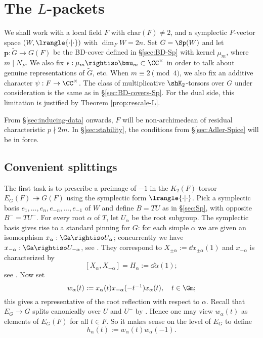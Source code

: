 \documentclass[a4paper,10pt]{article}
\begin{document}
\section{The \texorpdfstring{$L$}{L}-packets}\label{sec:packets}
We shall work with a local field $F$ with $\text{char}(F) \neq 2$, and a symplectic $F$-vector space $(W, \lrangle{\cdot|\cdot})$ with $\dim_F W = 2n$. Set $G = \Sp(W)$ and let $\bm{p}: \tilde{G} \to G(F)$ be the BD-cover defined in \S\ref{sec:BD-Sp} with kernel $\mu_m$, where $m \mid N_F$. We also fix $\epsilon: \mu_m \rightiso \bmu_m \subset \CC^\times$ in order to talk about genuine representations of $\tilde{G}$, etc. When $m \equiv 2 \pmod 4$, we also fix an additive character $\psi: F \to \CC^\times$. The class of multiplicative $\shK_2$-torsors over $G$ under consideration is the same as in \S\ref{sec:BD-covers-Sp}. For the dual side, this limitation is justified by Theorem \ref{prop:rescale-L}.

From \S\ref{sec:inducing-data} onwards, $F$ will be non-archimedean of residual characteristic $p \nmid 2m$. In \S\ref{sec:stability}, the conditions from \S\ref{sec:Adler-Spice} will be in force.

\subsection{Convenient splittings}\label{sec:splittings-S}
The first task is to prescribe a preimage of $-1$ in the $K_2(F)$-torsor $E_G(F) \twoheadrightarrow G(F)$ using the symplectic form $\lrangle{\cdot|\cdot}$. Pick a symplectic basis $e_1, \ldots, e_n, e_{-n}, \ldots, e_{-1}$ of $W$ and define $B = TU$ as in \S\ref{sec:Sp}, with opposite $B^- = TU^-$. For every root $\alpha$ of $T$, let $U_\alpha$ be the root subgroup. The symplectic basis gives rise to a standard pinning for $G$: for each simple $\alpha$ we are given an isomorphism $x_\alpha: \Ga \rightiso U_\alpha$; concurrently we have $x_{-\alpha}: \Ga \rightiso U_{-\alpha}$, see \cite[Exp XXIII, 1.2]{SGA3-3}. They correspond to $X_{\pm\alpha} := \dd x_{\pm\alpha}(1)$ and $x_{-\alpha}$ is characterized by
\[ [X_\alpha, X_{-\alpha}] = H_\alpha := \dd\check{\alpha}(1); \]
see \cite[Exp XX, Corollaire 2.11]{SGA3-3}. Now set
\[ w_\alpha(t) := x_\alpha(t) x_{-\alpha}(-t^{-1}) x_\alpha(t), \quad t \in \Gm; \]
this gives a representative of the root reflection with respect to $\alpha$. Recall that $E_G \to G$ splits canonically over $U$ and $U^-$ by \cite[Proposition 3.2]{BD01}. Hence one may view $w_\alpha(t)$ as elements of $E_G(F)$ for all $t \in F$. So it makes sense on the level of $E_G$ to define
\begin{equation}\label{eqn:h_alpha}
	h_\alpha(t) := w_\alpha(t) w_\alpha(-1).
\end{equation}
\end{document}
